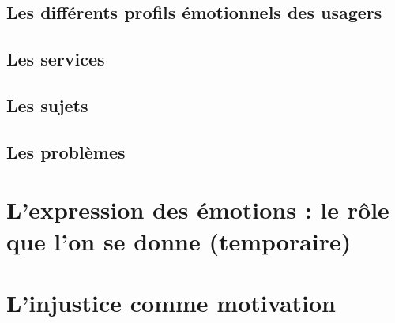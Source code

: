 \documentclass[a4paper,12pt]{report}
\begin{document}
\section{Les différents profils émotionnels des usagers}
\section{Les services}
\section{Les sujets}
\section{Les problèmes}
\chapter{L'expression des émotions : le rôle que l'on se donne (temporaire)}
\chapter{L'injustice comme motivation}


\clearpage
\newpage

\printbibliography

\break
\end{document}
